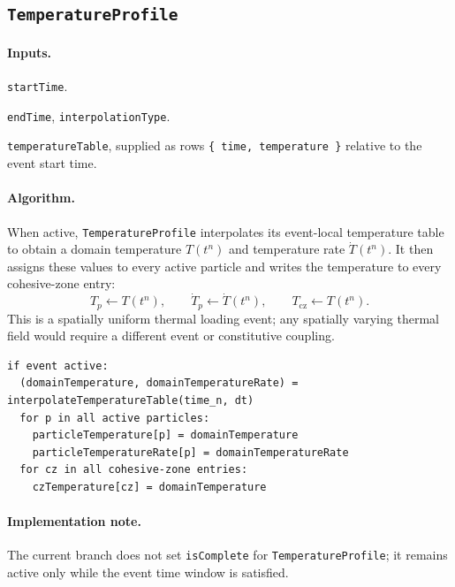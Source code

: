 \subsection{\texttt{TemperatureProfile}}
\label{subsec:event-temperature-profile}

\paragraph{Inputs.}
\begin{description}[leftmargin=*,style=nextline]
\item[\textbf{Required.}] \texttt{startTime}.
\item[\textbf{Optional.}] \texttt{endTime}, \texttt{interpolationType}.
\item[\textbf{Required.}] \texttt{temperatureTable}, supplied as rows \texttt{\{ time, temperature \}} relative to the event start time.
\end{description}

\paragraph{Algorithm.}
When active, \texttt{TemperatureProfile} interpolates its event-local temperature table to obtain a domain temperature $T(t^n)$ and temperature rate $\dot{T}(t^n)$.  It then assigns these values to every active particle and writes the temperature to every cohesive-zone entry:
\begin{equation}
  T_p\leftarrow T(t^n),
  \qquad
  \dot{T}_p\leftarrow \dot{T}(t^n),
  \qquad
  T_{\mathrm{cz}}\leftarrow T(t^n).
  \label{eq:temperature-profile-update}
\end{equation}
This is a spatially uniform thermal loading event; any spatially varying thermal field would require a different event or constitutive coupling.

\begin{lstlisting}[caption={TemperatureProfile event pseudocode.}]
if event active:
  (domainTemperature, domainTemperatureRate) = interpolateTemperatureTable(time_n, dt)
  for p in all active particles:
    particleTemperature[p] = domainTemperature
    particleTemperatureRate[p] = domainTemperatureRate
  for cz in all cohesive-zone entries:
    czTemperature[cz] = domainTemperature
\end{lstlisting}

\paragraph{Implementation note.}
The current branch does not set \texttt{isComplete} for \texttt{TemperatureProfile}; it remains active only while the event time window is satisfied.

